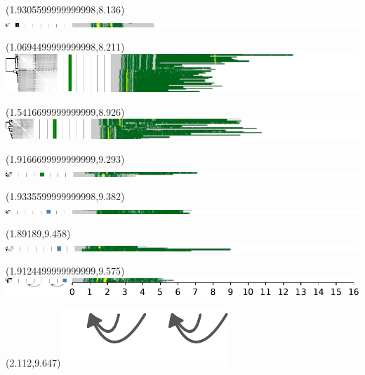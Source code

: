 \documentclass{article}
\begin{document}
\begin{textblock}{13}(1.9305599999999998,8.136)\includegraphics{./Figure_S5/14qtel_1-500K_1_12_12_rc-HG001.pdf}\end{textblock}
\begin{textblock}{13}(1.0694499999999998,8.211)\includegraphics{./Figure_S5/14qtel_1-500K_1_12_12_rc-HG002.pdf}\end{textblock}
\begin{textblock}{13}(1.5416699999999999,8.926)\includegraphics{./Figure_S5/14qtel_1-500K_1_12_12_rc-HG003.pdf}\end{textblock}
\begin{textblock}{13}(1.9166699999999999,9.293)\includegraphics{./Figure_S5/14qtel_1-500K_1_12_12_rc-HG004.pdf}\end{textblock}
\begin{textblock}{13}(1.9335599999999998,9.382)\includegraphics{./Figure_S5/14qtel_1-500K_1_12_12_rc-HG005.pdf}\end{textblock}
\begin{textblock}{13}(1.89189,9.458)\includegraphics{./Figure_S5/14qtel_1-500K_1_12_12_rc-HG006.pdf}\end{textblock}
\begin{textblock}{13}(1.9124499999999999,9.575)\includegraphics{./Figure_S5/14qtel_1-500K_1_12_12_rc-HG007.pdf}\end{textblock}
\begin{textblock}{13}(2.112,9.647)\includegraphics[width=.755in,keepaspectratio]{Figure_4/fatter-arrows.pdf}\end{textblock}
\end{document}
